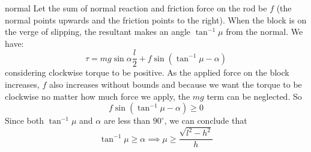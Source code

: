 \begin{solution}{normal}
Let the sum of normal reaction and friction force on the rod be $f$ (the normal points upwards and the friction points to the right). When the block is on the verge of slipping, the resultant makes an angle $\tan^{-1} \mu$ from the normal. We have:
$$\tau = mg\sin \alpha\frac{l}{2} + f \sin (\tan^{-1} \mu - \alpha)$$
considering clockwise torque to be positive. As the applied force on the block increases, $f$ also increases without bounds and because we want the torque to be clockwise no matter how much force we apply, the $mg$ term can be neglected. So
$$f \sin(\tan^{-1}\mu-\alpha) \ge 0$$
Since both $\tan^{-1}\mu$ and $\alpha$ are less than $90^{\circ}$, we can conclude that
$$\boxed{\tan^{-1} \mu \ge \alpha \implies \mu \ge \frac{\sqrt{l^2-h^2}}{h}}$$
\end{solution}
